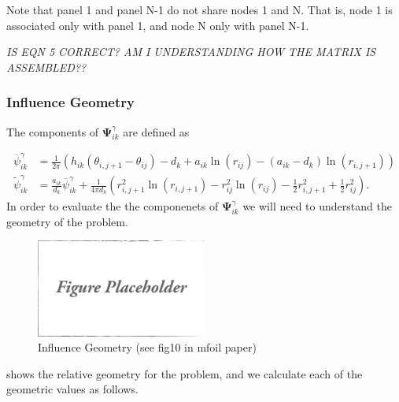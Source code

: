 \documentclass[]{article}
\begin{document}
\noindent Note that panel 1 and panel N-1 do not share nodes 1 and N. That is, node 1 is associated only with panel 1, and node N only with panel N-1. 

\textit{IS EQN 5 CORRECT?  AM I UNDERSTANDING HOW THE MATRIX IS ASSEMBLED??}


\subsubsection{Influence Geometry}

The components of \(\mathbf{\Psi}^\gamma_{ik}\) are defined as 

\begin{align}
	\overline{\psi}^\gamma_{ik} &= \frac{1}{2\pi} \left( h_{ik} (\theta_{i,j+1} - \theta_{ij}) - d_k + a_{ik} \ln(r_{ij}) - (a_{ik}-d_k)\ln(r_{i,j+1}) \right) \\
	\widetilde{\psi}^\gamma_{ik} &= \frac{a_{ik}}{d_k}\overline{\psi}^\gamma_{ik} + \frac{1}{4\pi d_k} \left(r^2_{i,j+1} \ln(r_{i,j+1}) - r^2_{ij} \ln(r_{ij}) - \frac{1}{2}r^2_{i,j+1} + \frac{1}{2}r^2_{ij} \right).
\end{align}
\noindent In order to evaluate the the componenets of \(\mathbf{\Psi}^\gamma_{ik}\) we will need to understand the geometry of the problem.

\begin{figure}[h]
	\centering
	\includegraphics[width=0.5\textwidth]{draft}
	\caption{Influence Geometry (see fig10 in mfoil paper)}
	\label{fig:influencegeometry}
\end{figure}

 shows the relative geometry for the problem, and we calculate each of the geometric values as follows.
\end{document}
